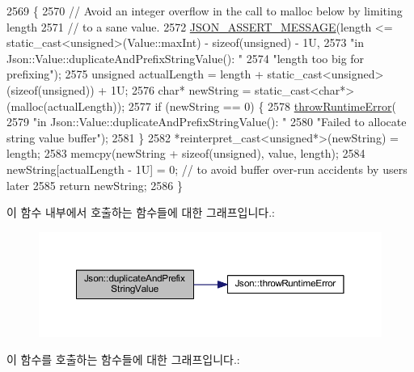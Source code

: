\begin{DoxyCode}
2569 \{
2570   \textcolor{comment}{// Avoid an integer overflow in the call to malloc below by limiting length}
2571   \textcolor{comment}{// to a sane value.}
2572   \hyperlink{json_8h_ad7facdeeca0f495765e3b204c265eadb}{JSON\_ASSERT\_MESSAGE}(length <= static\_cast<unsigned>(Value::maxInt) - \textcolor{keyword}{sizeof}(\textcolor{keywordtype}{unsigned}) 
      - 1U,
2573                       \textcolor{stringliteral}{"in Json::Value::duplicateAndPrefixStringValue(): "}
2574                       \textcolor{stringliteral}{"length too big for prefixing"});
2575   \textcolor{keywordtype}{unsigned} actualLength = length + \textcolor{keyword}{static\_cast<}\textcolor{keywordtype}{unsigned}\textcolor{keyword}{>}(\textcolor{keyword}{sizeof}(unsigned)) + 1U;
2576   \textcolor{keywordtype}{char}* newString = \textcolor{keyword}{static\_cast<}\textcolor{keywordtype}{char}*\textcolor{keyword}{>}(malloc(actualLength));
2577   \textcolor{keywordflow}{if} (newString == 0) \{
2578     \hyperlink{namespace_json_a0ab7ff7f99788262d92d9ff3d924e065}{throwRuntimeError}(
2579         \textcolor{stringliteral}{"in Json::Value::duplicateAndPrefixStringValue(): "}
2580         \textcolor{stringliteral}{"Failed to allocate string value buffer"});
2581   \}
2582   *\textcolor{keyword}{reinterpret\_cast<}\textcolor{keywordtype}{unsigned}*\textcolor{keyword}{>}(newString) = length;
2583   memcpy(newString + \textcolor{keyword}{sizeof}(\textcolor{keywordtype}{unsigned}), value, length);
2584   newString[actualLength - 1U] = 0; \textcolor{comment}{// to avoid buffer over-run accidents by users later}
2585   \textcolor{keywordflow}{return} newString;
2586 \}
\end{DoxyCode}
이 함수 내부에서 호출하는 함수들에 대한 그래프입니다.\+:\nopagebreak
\begin{figure}[H]
\begin{center}
\leavevmode
\includegraphics[width=350pt]{namespace_json_a9795a09a0141d1f12d307c4386aeaee6_cgraph}
\end{center}
\end{figure}
이 함수를 호출하는 함수들에 대한 그래프입니다.\+:\nopagebreak
